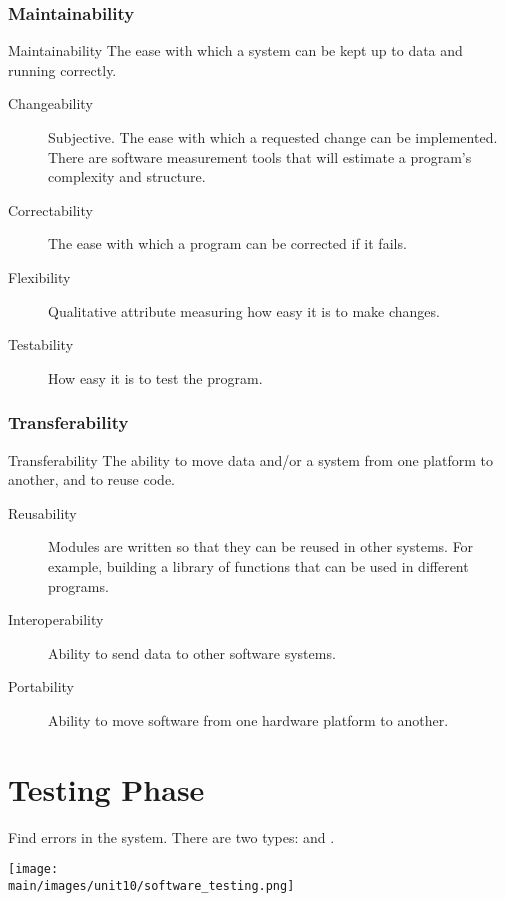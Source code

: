 \documentclass[\main/notes.tex]{subfiles}
\begin{document}
				\subsubsection{Maintainability}
					\begin{definition}{Maintainability}
						The ease with which a system can be kept up to data and running correctly.
					\end{definition}
					\begin{description}
						\item[Changeability] Subjective. The ease with which a requested change can be implemented. There are software measurement tools that will estimate a program's complexity and structure.
						\item[Correctability] The ease with which a program can be corrected if it fails.
						\item[Flexibility] Qualitative attribute measuring how easy it is to make changes.
						\item[Testability] How easy it is to test the program.
					\end{description}
				\subsubsection{Transferability}
					\begin{definition}{Transferability}
							The ability to move data and/or a system from one platform to another, and to reuse code.
					\end{definition}
					\begin{description}
						\item[Reusability] Modules are written so that they can be reused in other systems. For example, building a library of functions that can be used in different programs.
						\item[Interoperability] Ability to send data to other software systems.
						\item[Portability] Ability to move software from one hardware platform to another.
					\end{description}

		\pagebreak
		\section{Testing Phase}
			Find errors in the system. There are two types:  and .
			\begin{center}
				\texttt{[image: \\main/images/unit10/software\_testing.png]}
			\end{center}
\end{document}

